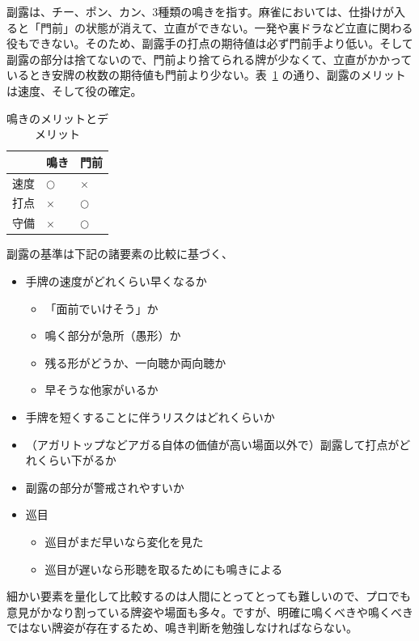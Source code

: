 \documentclass[../nankiru_main.tex]{subfiles}
\begin{document}

副露は、チー、ポン、カン、3種類の鳴きを指す。麻雀においては、仕掛けが入ると「門前」の状態が消えて、立直ができない。一発や裏ドラなど立直に関わる役もできない。そのため、副露手の打点の期待値は必ず門前手より低い。そして副露の部分は捨てないので、門前より捨てられる牌が少なくて、立直がかかっているとき安牌の枚数の期待値も門前より少ない。表~\ref{tab:naki-compare} の通り、副露のメリットは速度、そして役の確定。

\begin{table}[ht]
  \centering
  \begin{tabular}{lll}
    & 鳴き & 門前 \\
    \hline
    速度 & $\bigcirc$ & $\times$ \\
    打点 & $\times$ & $\bigcirc$ \\
    守備 & $\times$ & $\bigcirc$
  \end{tabular}
  \caption{鳴きのメリットとデメリット\citep[][p.~87]{hirasawa-naki}}
  \label{tab:naki-compare}
\end{table}

副露の基準は下記の諸要素の比較に基づく、

\begin{itemize}
  \item 手牌の速度がどれくらい早くなるか
  \begin{itemize}
    \item 「面前でいけそう」か
    \item 鳴く部分が急所（愚形）か
    \item 残る形がどうか、一向聴か両向聴か
    \item 早そうな他家がいるか
  \end{itemize}
  \item 手牌を短くすることに伴うリスクはどれくらいか
  \item （アガリトップなどアガる自体の価値が高い場面以外で）副露して打点がどれくらい下がるか
  \item 副露の部分が警戒されやすいか
  \item 巡目
  \begin{itemize}
    \item 巡目がまだ早いなら変化を見た
    \item 巡目が遅いなら形聴を取るためにも鳴きによる
  \end{itemize}
\end{itemize}

細かい要素を量化して比較するのは人間にとってとっても難しいので、プロでも意見がかなり割っている牌姿や場面も多々。ですが、明確に鳴くべきや鳴くべきではない牌姿が存在するため、鳴き判断を勉強しなければならない。
\end{document}
